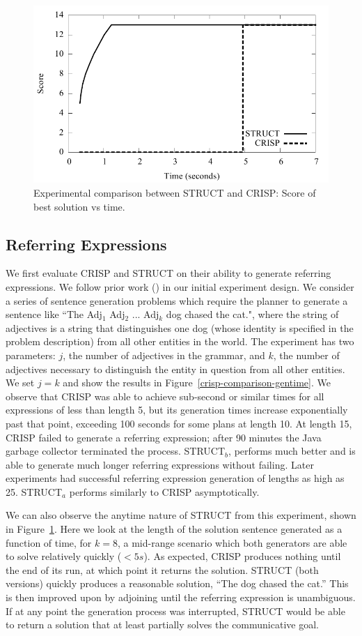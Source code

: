 \begin{figure}
\includegraphics[width=0.7 \linewidth ]{../analysis/plots/complex-goal/complex-goal-anytime.pdf}
\caption{Experimental comparison between STRUCT and  CRISP:
Score of best solution vs time.}
\label{crisp-comparison-score}
\end{figure}

\subsection{Referring Expressions}
We first evaluate CRISP and STRUCT on their ability to generate
referring expressions. We follow prior work (\cite{koller_experiences_2011})
in our initial experiment design.  We consider a series of sentence
generation problems which require the planner to generate a sentence
like ``The Adj$_1$ Adj$_2$ ... Adj$_k$ dog chased the cat.",
where the string of adjectives is a string that distinguishes one
dog (whose identity is specified in the problem description) from
all other entities in the world.
The experiment has two parameters: $j$, the number of adjectives in
the grammar, and $k$, the number of adjectives necessary to
distinguish the entity in question from all other entities. We set $j
= k$ and show the results in Figure~\ref{crisp-comparison-gentime}.
We observe that CRISP was able to achieve
sub-second or similar times for all expressions of less than length 5, but its
generation times increase exponentially past that point, exceeding 100
seconds for some plans at length 10. At length 15, CRISP failed to
generate a referring expression; after 90 minutes the Java garbage
collector terminated the process. STRUCT$_b$, performs much better and
is able to generate much longer referring expressions without failing.
Later experiments had successful referring expression generation of lengths
as high as 25.  STRUCT$_a$ performs similarly to CRISP asymptotically.

We can also observe the anytime nature of STRUCT from this experiment,
shown in Figure~\ref{crisp-comparison-score}.  Here we look at the
length of the solution sentence generated as a function of time, for
$k=8$, a mid-range scenario which both generators are able to solve
relatively quickly ($< 5s$).  As expected, CRISP produces nothing until
the end of its run, at which point it returns the solution. STRUCT (both versions)
quickly produces a reasonable solution, ``The dog chased the
cat.''  This is then improved upon by adjoining until the referring
expression is unambiguous. If at any point the generation process was
interrupted, STRUCT would be able to return a solution that at least
partially solves the communicative goal.

